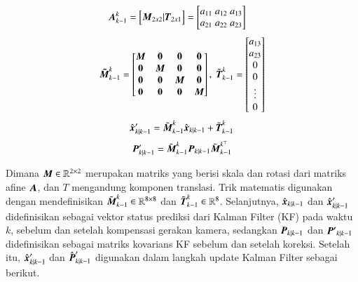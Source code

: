 \begin{equation}
  \begin{aligned}
      & \vb*{A}_{k-1}^k = 
      \begin{bmatrix}
          \vb*{M}_{2x2} | \vb*{T}_{2x1}
      \end{bmatrix} = 
      \begin{bmatrix}
          a_{11}\;a_{12}\;a_{13} \\ a_{21}\;a_{22}\;a_{23} \\ 
      \end{bmatrix}
  \end{aligned}
\end{equation}
\begin{equation}
  \begin{aligned}
  {
      \vb*{\tilde{M}}}^k_{k-1} = 
      \begin{bmatrix}
      \vb*{M} & \vb*{0} & \vb*{0} & \vb*{0} \\
      \vb*{0} & \vb*{M} & \vb*{0} & \vb*{0} \\
      \vb*{0} & \vb*{0} & \vb*{M} & \vb*{0} \\
      \vb*{0} & \vb*{0} & \vb*{0} & \vb*{M}
      \end{bmatrix}, \; 
      \tilde{\vb*{T}}_{k-1}^k = 
      \begin{bmatrix}a_{13}\\a_{23}\\ 0\\ 0\\ \vdots \\ 0\end{bmatrix}
  \end{aligned}
\end{equation}
\begin{equation}
  \begin{aligned}
      \hat{\vb*{x}}^\prime_{k|k-1} = \tilde{\vb*{M}}_{k-1}^k \hat{\vb*{x}}_{k|k-1} + \tilde{\vb*{T}}_{k-1}^k \\
  \end{aligned}
\end{equation}
\begin{equation}
    {{\vb*{P}}}^{\prime}_{k|k-1} = 
    \tilde{\vb*{M}}_{k-1}^k {\vb*{P}}_{k|k-1} {\tilde{\vb*{M}}_{k-1}}^{k^\top}
    \label{eq:cmc_cov}        
\end{equation}

Dimana $\vb*{M}\in \mathbb{R}^{2 \times 2}$ merupakan matriks yang berisi skala dan rotasi dari matriks afine $\vb*{A}$, dan $T$ mengandung komponen translasi. Trik matematis digunakan dengan mendefinisikan $\tilde{\vb*{M}}^k_{k-1}\in \mathbb{R}^{8 \times 8}$ dan $\tilde{\vb*{T}}_{k-1}^k\in \mathbb{R}^{8}$. Selanjutnya, $\hat{\vb*{x}}_{k|k-1}$ dan $\hat{\vb*{x}}^\prime_{k|k-1}$ didefinisikan sebagai vektor status prediksi dari Kalman Filter (KF) pada waktu $k$, sebelum dan setelah kompensasi gerakan kamera, sedangkan $\vb*{P}_{k|k-1}$ dan $\vb*{P'}_{k|k-1}$ didefinisikan sebagai matriks kovarians KF sebelum dan setelah koreksi. Setelah itu, $\hat{\vb*{x}}^\prime_{k|k-1}$ dan ${{\hat{\vb*{P}}}^{\prime}}_{k|k-1}$ digunakan dalam langkah update Kalman Filter sebagai berikut.

